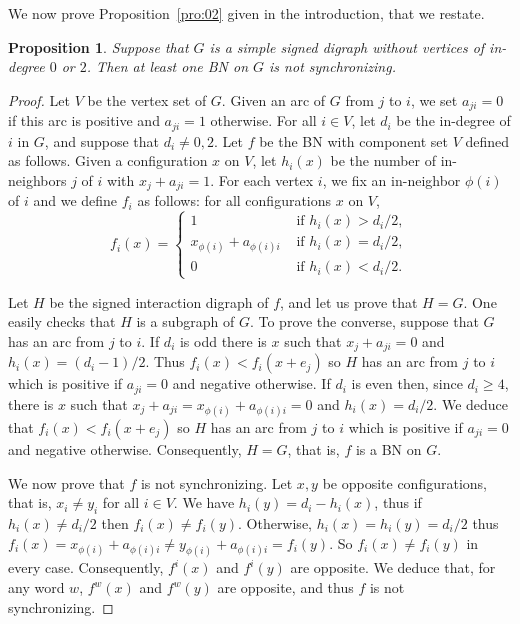 \documentclass[11pt,letter]{article}
\newtheorem{proposition}{Proposition}
\begin{document}
\medskip
We now prove Proposition~\ref{pro:02} given in the introduction, that we restate.

\setcounter{proposition}{0}
\begin{proposition}
Suppose that $G$ is a simple signed digraph without vertices of in-degree $0$ or $2$. Then at least one BN on $G$ is not synchronizing.
\end{proposition} 
\setcounter{proposition}{2}

\begin{proof}
Let $V$ be the vertex set of $G$. Given an arc of $G$ from $j$ to $i$, we set $a_{ji}=0$ if this arc is positive and $a_{ji}=1$ otherwise. For all $i\in V$, let $d_i$ be the in-degree of $i$ in $G$, and suppose that $d_i\neq 0,2$. Let $f$ be the BN with component set $V$ defined as follows. Given a configuration $x$ on $V$, let $h_i(x)$ be the number of in-neighbors $j$ of $i$ with $x_j+a_{ji}=1$. For each vertex $i$, we fix an in-neighbor $\phi(i)$ of $i$ and we define $f_i$ as follows: for all configurations $x$ on $V$, 
\[
f_i(x)=
\left\{
\begin{array}{ll}
1&\textrm{ if $h_i(x)>d_i/2$,}\\[1mm]
x_{\phi(i)}+a_{\phi(i)i}&\textrm{ if $h_i(x)=d_i/2$},\\[1mm]
0&\textrm{ if $h_i(x)<d_i/2$.}
\end{array}
\right.
\]

\medskip
Let $H$ be the signed interaction digraph of $f$, and let us prove that $H=G$. One easily checks that $H$ is a subgraph of $G$. To prove the converse, suppose that $G$ has an arc from $j$ to $i$. If $d_i$ is odd there is $x$ such that $x_j+a_{ji}=0$ and $h_i(x)=(d_i-1)/2$. Thus $f_i(x)<f_i(x+e_j)$ so $H$ has an arc from $j$ to $i$ which is positive if $a_{ji}=0$ and negative otherwise. If $d_i$ is even then, since $d_i\geq 4$, there is $x$ such that $x_j+a_{ji}=x_{\phi(i)}+a_{\phi(i)i}=0$ and $h_i(x)=d_i/2$. We deduce that $f_i(x)<f_i(x+e_j)$ so $H$ has an arc from $j$ to $i$ which is positive if $a_{ji}=0$ and negative otherwise. Consequently, $H=G$, that is, $f$ is a BN on $G$. 

\medskip
We now prove that $f$ is not synchronizing. Let $x,y$ be opposite configurations, that is, $x_i\neq y_i$ for all $i\in V$. We have $h_i(y)=d_i-h_i(x)$, thus if $h_i(x)\neq d_i/2$ then $f_i(x)\neq f_i(y)$. Otherwise, $h_i(x)=h_i(y)=d_i/2$ thus $f_i(x)=x_{\phi(i)}+a_{\phi(i)i}\neq y_{\phi(i)}+a_{\phi(i)i}=f_i(y)$. So $f_i(x)\neq f_i(y)$ in every case. Consequently, $f^i(x)$ and $f^i(y)$ are opposite. We deduce that, for any word $w$, $f^w(x)$ and $f^w(y)$ are opposite, and thus $f$ is not synchronizing.
\end{proof}
\end{document}
